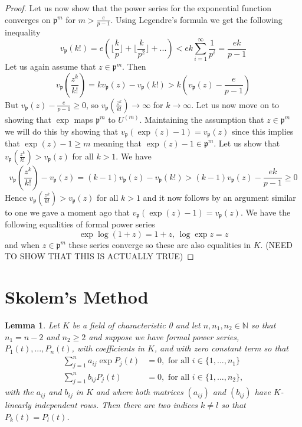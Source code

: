 \documentclass{article}
\newtheorem{lemma}{Lemma}[section]
\newcommand{\mfrak}[1]{\mathfrak{#1}}
\newcommand{\mbb}[1]{\mathbb{#1}}
\newcommand{\vp}{{v_{\mfrak p}}}
\begin{document}
\begin{proof}
    Let us now show that the power series for the exponential function converges on $\mfrak p^m$ for $m > \frac{e}{p-1}$. Using Legendre's formula we get the following inequality
    $$\vp(k!) = e(\lfloor \frac{k}{p} \rfloor + \lfloor \frac{k}{p^2} \rfloor + ...) < ek \sum_{i=1}^\infty \frac{1}{p^i} = \frac{ek}{p-1}$$
    Let us again assume that $z \in \mfrak p^m$. Then
    $$\vp(\frac{z^k}{k!}) = k\vp(z) - \vp(k!) > k(\vp(z) - \frac{e}{p-1})$$
    But $\vp(z) - \frac{e}{p-1} \geq 0$, so $\vp(\frac{z^k}{k!}) \to \infty$ for $k \to \infty$. Let us now move on to showing that $\exp$ maps $\mfrak p^m$ to $U^{(m)}$. Maintaining the assumption that $z \in \mfrak p^m$ we will do this by showing that $\vp(\exp(z) - 1) = \vp(z)$ since this implies that $\exp(z) - 1 \geq m$ meaning that $\exp(z) - 1 \in \mfrak p^m$. Let us show that $\vp(\frac{z^k}{k!}) > \vp(z)$ for all $k > 1$. We have
    $$\vp(\frac{z^k}{k!}) - \vp(z) = (k-1)\vp(z) - \vp(k!) > (k-1)\vp(z) - \frac{ek}{p-1} \geq 0$$
    Hence $\vp(\frac{z^k}{k!}) > \vp(z)$ for all $k > 1$ and it now follows by an argument similar to one we gave a moment ago that $\vp(\exp(z) - 1) = \vp(z)$. We have the following equalities of formal power series
    $$\exp \log (1 + z) = 1 + z \text{, } \log \exp z = z$$
    and when $z \in \mfrak p^m$ these series converge so these are also equalities in $K$. (NEED TO SHOW THAT THIS IS ACTUALLY TRUE) 
\end{proof}



\section{Skolem's Method}


\begin{lemma} \label{lem: Two power series are equal}
    Let $K$ be a field of characteristic 0 and let $n,n_1,n_2 \in \mbb N$ so that $n_1 = n - 2$ and $n_2 \geq 2$ and suppose we have formal power series, $P_1(t), ..., P_n(t)$, with coefficients in $K$, and with zero constant term so that
    \begin{align*}
        \sum_{j = 1}^n a_{ij} \exp P_j(t) &= 0, \text{ for all } i \in \{1, ..., n_1\} \\
        \sum_{j = 1}^n b_{ij} P_j(t) &= 0, \text{ for all } i \in \{1, ..., n_2\},
    \end{align*}
    with the $a_{ij}$ and $b_{ij}$ in $K$ and where both matrices $(a_{ij})$ and $(b_{ij})$ have $K$-linearly independent rows. Then there are two indices $k \neq l$ so that $P_k(t) = P_l(t)$.
\end{lemma}
\end{document}
